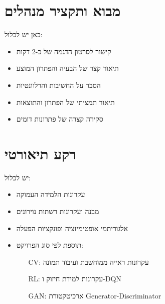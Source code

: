 \documentclass[11pt]{article}
\begin{document}
\tableofcontents
\newpage

\listoffigures
\newpage

\section{מבוא ותקציר מנהלים}
\begin{fillbox}
כאן יש לכלול:
\begin{itemize}
  \item קישור לסרטון הדגמה של כ-2 דקות
  \item תיאור קצר של הבעיה והפתרון המוצע
  \item הסבר על החשיבות והרלוונטיות
  \item תיאור תמציתי של הפתרון והתוצאות
  \item סקירה קצרה של פתרונות דומים
\end{itemize}
\end{fillbox}

\section{רקע תיאורטי}
\begin{fillbox}
יש לכלול:
\begin{itemize}
  \item עקרונות הלמידה העמוקה
  \item מבנה ועקרונות רשתות נוירונים
  \item אלגוריתמי אופטימיזציה ופונקציות הפעלה
  \item תוספת לפי סוג הפרויקט:
  \begin{itemize}
    \item[CV:] עקרונות ראייה ממוחשבת ועיבוד תמונה
    \item[RL:] עקרונות למידת חיזוק ו-DQN
    \item[GAN:] ארכיטקטורת Generator-Discriminator
  \end{itemize}
\end{itemize}
\end{fillbox}
\end{document}
